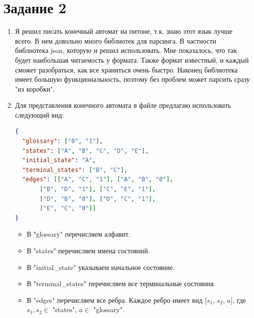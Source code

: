 \documentclass{article}
\begin{document}
	\section*{Задание 2}

\begin{enumerate}
	\item Я решил писать конечный автомат на питоне, т.к. знаю этот язык лучше всего. В нем довольно много библиотек для парсинга. В частности библиотека \textrm{json}, которую и решил использовать. Мне показалось, что так будет наибольшая читаемость у формата. Также формат известный, и каждый сможет разобраться, как все храниться очень быстро. Наконец библиотека имеет большую функциональность, поэтому без проблем может парсить сразу "из коробки".
	
	\item Для представления конечного автомата в файле предлагаю использовать следующий вид:
		
\begin{lstlisting}[language=json,firstnumber=1]
{
  "glossary": ["0", "1"],
  "states": ["A", "B", "C", "D", "E"],
  "initial_state": "A",
  "terminal_states": ["B", "C"],
  "edges": [["A", "C", "1"], ["A", "B", "0"], 
  	   ["B", "D", "1"], ["C", "E", "1"], 
  	   ["D", "B", "0"], ["D", "C", "1"], 
  	   ["E", "C", "0"]]
}
\end{lstlisting}

\begin{itemize}
	\item В "glossary" перечисляем алфавит.
	
	\item В "states" перечисляем имена состояний.
	
	\item В "initial\_state" указываем начальное состояние.
	
	\item В "terminal\_states" перечисляем все терминальные состояния.
	
	\item В "edges" перечисляем все ребра. Каждое ребро имеет вид \textrm{[$s_1$, $s_2$, $a$]}, где $s_1, s_2 \in $ "states", $a \in $ "glossary".
\end{itemize}
\end{enumerate}




	
\end{document}
